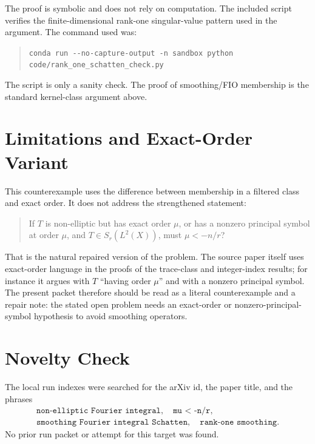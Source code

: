 \documentclass[11pt]{article}
\begin{document}
The proof is symbolic and does not rely on computation.  The included script
 verifies the finite-dimensional
rank-one singular-value pattern used in the argument.  The command used was:

\begin{quote}\small
\verb|conda run --no-capture-output -n sandbox python code/rank_one_schatten_check.py|
\end{quote}

The script is only a sanity check.  The proof of smoothing/FIO membership is
the standard kernel-class argument above.

\section{Limitations and Exact-Order Variant}\label{sec:limitations}

This counterexample uses the difference between membership in a filtered class
and exact order.  It does not address the strengthened statement:

\begin{quote}
If \(T\) is non-elliptic but has exact order \(\mu\), or has a nonzero
principal symbol at order \(\mu\), and \(T\in S_r(L^2(X))\), must
\(\mu<-n/r\)?
\end{quote}

That is the natural repaired version of the problem.  The source paper itself
uses exact-order language in the proofs of the trace-class and integer-index
results; for instance it argues with \(T\) ``having order \(\mu\)'' and with a
nonzero principal symbol.  The present packet therefore should be read as a
literal counterexample and a repair note: the stated open problem needs an
exact-order or nonzero-principal-symbol hypothesis to avoid smoothing
operators.

\section*{Novelty Check}

The local run indexes were searched for the arXiv id, the paper title, and
the phrases
\[
\begin{gathered}
\texttt{non-elliptic Fourier integral},\quad
\texttt{mu < -n/r},\\
\texttt{smoothing Fourier integral Schatten},\quad
\texttt{rank-one smoothing}.
\end{gathered}
\]
No prior run packet or attempt for this target was found.
\end{document}
